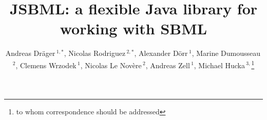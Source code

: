 \documentclass{bioinfo}
\begin{document}
\application
\title[JSBML: The Java library for SBML]{JSBML: a flexible Java library
for working with SBML} \author[Dr\"ager \textit{et~al.}]{Andreas
Dr\"ager\,$^{1,*}$, Nicolas Rodriguez\,$^{2,*}$,
Alexander D\"orr\,$^{1}$,
Marine Dumousseau\,$^{2}$,
Clemens Wrzodek\,$^{1}$,
Nicolas Le Nov\`{e}re\,$^{2}$,
Andreas Zell\,$^{1}$,
Michael Hucka\,$^{3,}$\footnote{to whom correspondence should be addressed}}
\address{$^{1}$Center for Bioinformatics Tuebingen, University of Tuebingen, T\"ubingen, Germany.\\
$^{2}$European Bioinformatics Institute, Wellcome Trust Genome Campus, Hinxton, Cambridge, UK\\
$^{3}$Computing and Mathematical Sciences, California Institute of Technology, Pasadena, CA, USA}



\maketitle
\end{document}
